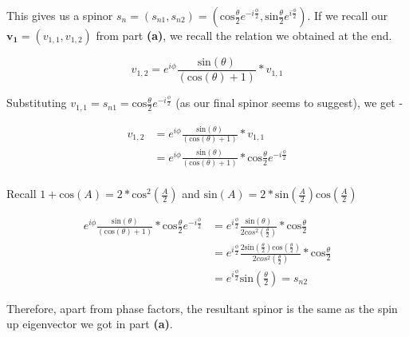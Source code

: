     This gives us a spinor $s_{n} = (s_{n1}, s_{n2}) = (\textrm{cos}\frac{\theta}{2}e^{-i\frac{\phi}{2}}, \textrm{sin}\frac{\theta}{2}e^{i\frac{\phi}{2}})$. If we recall our $\mathbf{v_{1}} = (v_{1,1}, v_{1,2})$ from part \textbf{(a)}, we recall the relation we obtained at the end.

    \begin{equation*}
        v_{1,2} = e^{i\phi}\frac{\textrm{sin}(\theta)}{(\textrm{cos}(\theta) + 1)}*v_{1,1}
    \end{equation*}

    Substituting $v_{1,1} = s_{n1} = \textrm{cos}\frac{\theta}{2}e^{-i\frac{\phi}{2}}$ (as our final spinor seems to suggest), we get - 

    \begin{equation*}
        \begin{split}
            v_{1,2} & = e^{i\phi}\frac{\textrm{sin}(\theta)}{(\textrm{cos}(\theta) + 1)}*v_{1,1} \\
            & = e^{i\phi}\frac{\textrm{sin}(\theta)}{(\textrm{cos}(\theta) + 1)}*\textrm{cos}\frac{\theta}{2}e^{-i\frac{\phi}{2}} \\
        \end{split}
    \end{equation*}

    Recall $1 + \textrm{cos}(A) = 2*\textrm{cos}^{2}(\frac{A}{2})$ and $\textrm{sin}(A) = 2*\textrm{sin}(\frac{A}{2})\textrm{cos}(\frac{A}{2})$

    \begin{equation*}
        \begin{split}
            e^{i\phi}\frac{\textrm{sin}(\theta)}{(\textrm{cos}(\theta) + 1)}*\textrm{cos}\frac{\theta}{2}e^{-i\frac{\phi}{2}} & = e^{i\frac{\phi}{2}}\frac{\textrm{sin}(\theta)}{2cos^{2}(\frac{\theta}{2})}*\textrm{cos}\frac{\theta}{2} \\
            & = e^{i\frac{\phi}{2}}\frac{2\textrm{sin}(\frac{\theta}{2})\textrm{cos}(\frac{\theta}{2})}{2cos^{2}(\frac{\theta}{2})}*\textrm{cos}\frac{\theta}{2} \\
            & = e^{i\frac{\phi}{2}}\textrm{sin}(\frac{\theta}{2}) = s_{n2}
        \end{split}
    \end{equation*}

    Therefore, apart from phase factors, the resultant spinor is the same as the spin up eigenvector we got in part \textbf{(a)}.
